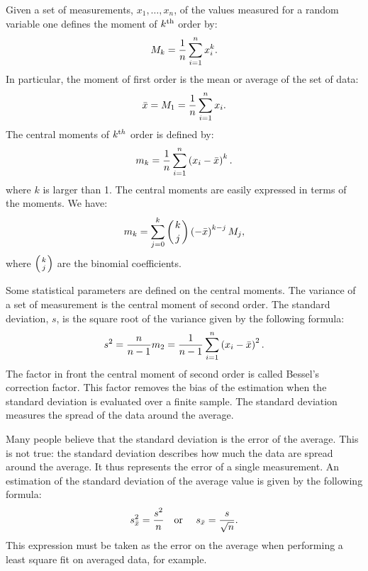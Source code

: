 Given a set of measurements, $x_1,\ldots,x_n$, of the values measured for a random variable one defines the moment of $k^{\mathop{\textrm{th}}}$
order by:
\begin{equation}
  M_k={1\over n}\sum_{i=1}^n x_i^k.
\end{equation}
In particular, the moment of first order is the mean or average of
the set of data:
\begin{equation}
\label{eq:average}
  \bar{x}=M_1={1\over n}\sum_{i=1}^n x_i.
\end{equation}
The central moments of $k^{\mathop{\textrm th}}$ order is defined by:
\begin{equation}
  m_k={1\over n}\sum_{i=1}^n \left(x_i-\bar{x}\right)^k.
\end{equation}
where $k$ is larger than 1. The central moments are easily
expressed in terms of the moments. We have:
\begin{equation}
  m_k=\sum_{j=0}^k \left({k \atop j}\right)\left(-\bar{x}\right)^{k-j}M_j,
\end{equation}
where $\left({k \atop j}\right)$ are the binomial coefficients.

Some statistical parameters are defined on the central moments.
The variance of a set of measurement is the central moment of
second order. The standard deviation, $s$, is the square root of
the variance given by the following formula:
\begin{equation}
s^2={\displaystyle n \over \displaystyle n-1}m_2 ={\displaystyle 1
\over \displaystyle n-1} \sum_{i=1}^n \left(x_i-\bar{x}\right)^2.
\end{equation}
The factor in front the central moment of second order is called
Bessel's correction factor. This factor removes the bias of the
estimation when the standard deviation is evaluated over a finite
sample. The standard deviation measures the spread of the data
around the average.

Many people believe that the standard deviation is the error of
the average. This is not true: the standard deviation describes
how much the data are spread around the average. It thus
represents the error of a single measurement. An estimation of the
standard deviation of the average value is given by the following
formula:
\begin{equation}
\label{eq:averagerror}
  s_{\bar{x}}^2={\displaystyle s^2 \over n}
  \mbox{\quad or \quad}
  s_{\bar{x}}={\displaystyle s \over \sqrt{n}}.
\end{equation}
This expression must be taken as the error on the average when
performing a least square fit on averaged data, for example.


